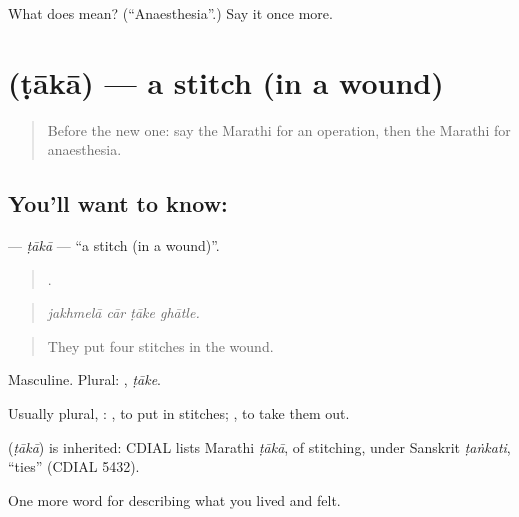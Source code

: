 \begin{tcolorbox}[breakable,colback=teal!4,colframe=teal!35!black,title={Before you move on}]
What does  mean? (\textquotedblleft{}Anaesthesia\textquotedblright{}.) Say it once more.
\end{tcolorbox}
\section[\texorpdfstring{\mr{टाका} (ṭākā)}{टाका (ṭākā)}]{ (ṭākā) — a stitch (in a wound)}

\label{lesson:MR-C489-taka}



\begin{quote}
Before the new one: say the Marathi for an operation, then the Marathi for anaesthesia.
\end{quote}

\subsection*{You'll want to know: }
\textbf{} — \emph{ṭākā} — \textquotedblleft{}a stitch (in a wound)\textquotedblright{}.

\begin{quote}
   .
\end{quote}

\begin{quote}
\emph{jakhmelā cār ṭāke ghātle.}
\end{quote}

\begin{quote}
They put four stitches in the wound.
\end{quote}

Masculine. Plural: , \emph{ṭāke}.

Usually plural, :  , to put in stitches;  , to take them out.

\begin{cousinweb}
\textbf{} (\emph{ṭākā}) is inherited: CDIAL lists Marathi \emph{ṭākā}, of stitching, under Sanskrit \emph{ṭaṅkati}, \textquotedblleft{}ties\textquotedblright{} (CDIAL 5432).
\end{cousinweb}

\begin{grammarlens}[title={What you've built}]
One more word for describing what you lived and felt.
\end{grammarlens}

